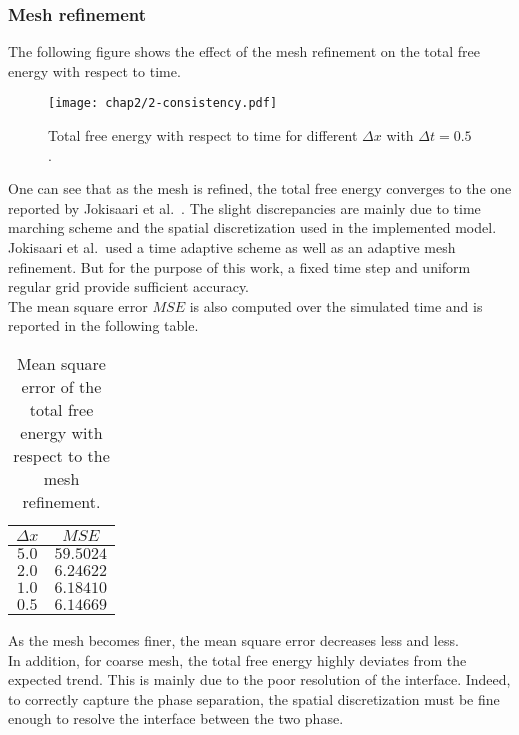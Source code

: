     \subsubsection{Mesh refinement}
    The following figure shows the effect of the mesh refinement on the total free energy with respect to time.
    \begin{figure}[H]
        \centering
        \texttt{[image: chap2/2-consistency.pdf]}
        \caption{Total free energy with respect to time for different $\Delta x$ with $\Delta t = 0.5$.}
        \label{fig:ftot_dx}
    \end{figure}
    One can see that as the mesh is refined, the total free energy converges to the one reported by Jokisaari et al.\ \cite{JokisaariVoorheesGuyerWarrenHeinonen2017}. The slight discrepancies are mainly due to time marching scheme and the spatial discretization used in the implemented model. Jokisaari et al.\ used a time adaptive scheme as well as an adaptive mesh refinement. But for the purpose of this work, a fixed time step and uniform regular grid provide sufficient accuracy.\\
    The mean square error $MSE$ is also computed over the simulated time and is reported in the following table.
    \begin{table}[H]
        \centering
        \begin{tabular}{|c|c|}
            \hline
            $\Delta x$ & $MSE$ \\
            \hline
            $5.0$ & $59.5024$ \\
            $2.0$ & $6.24622$ \\
            $1.0$ & $6.18410$ \\
            $0.5$ & $6.14669$ \\
            \hline
        \end{tabular}
        \caption{Mean square error of the total free energy with respect to the mesh refinement.}
        \label{tab:ftot_mse}
    \end{table}
    As the mesh becomes finer, the mean square error decreases less and less.\\
    In addition, for coarse mesh, the total free energy highly deviates from the expected trend. This is mainly due to the poor resolution of the interface. Indeed, to correctly capture the phase separation, the spatial discretization must be fine enough to resolve the interface between the two phase.
